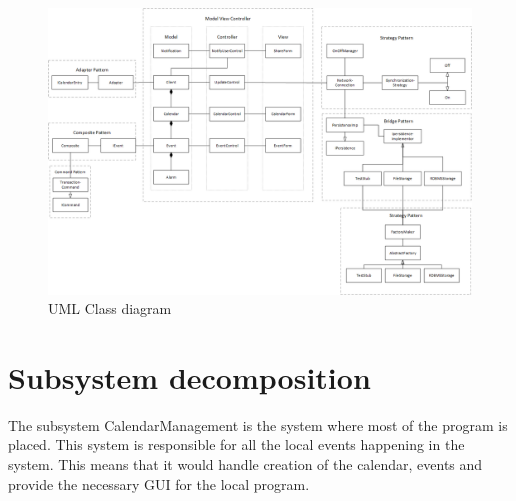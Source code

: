 \begin{figure}
\centering
\includegraphics[width=210mm]{class.png}
\caption{UML Class diagram \label{overflow}}
\end{figure}


\clearpage
\section*{Subsystem decomposition}
The subsystem CalendarManagement is the system where most of the program is placed. This system is responsible for all the local events happening in the system. This means that it would handle creation of the calendar, events and provide the necessary GUI for the local program. 

